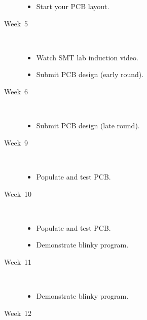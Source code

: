 \documentclass[11pt, a4paper]{article}
\begin{document}
\begin{description}
\begin{itemize}
  \item Start your PCB layout.
  \end{itemize}

\item [Week~5]\mbox{}\\[-0.4cm]

  \begin{itemize}
  \item Watch SMT lab induction video.

  \item Submit PCB design (early round).
  \end{itemize}

\item [Week~6]\mbox{}\\[-0.4cm]

  \begin{itemize}
  \item Submit PCB design (late round).
  \end{itemize}





\item [Week~9]\mbox{}\\[-0.4cm]

  \begin{itemize}
  \item Populate and test PCB.
  \end{itemize}


\item [Week~10]\mbox{}\\[-0.4cm]

  \begin{itemize}
  \item Populate and test PCB.
  \item Demonstrate blinky program.
  \end{itemize}

\item [Week~11]\mbox{}\\[-0.4cm]

  \begin{itemize}
  \item Demonstrate blinky program.
  \end{itemize}

\item [Week~12]\mbox{}\\[-0.4cm]


\end{description}
\end{document}
